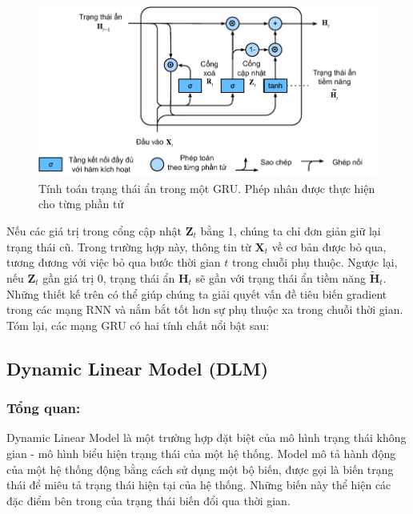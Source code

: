 \documentclass[conference]{IEEEtran}
\begin{document}
\begin{figure}[H]
    \centering
    \begin{minipage}{0.43\textwidth}
        \centering
        \includegraphics[width=1\textwidth]{bibliography/figure/GRU/gru_3.pdf}
        \caption{Tính toán trạng thái ẩn trong một GRU. Phép nhân được thực hiện cho từng phần tử}
        \label{fig:gru_up}
    \end{minipage}

\end{figure}

Nếu các giá trị trong cổng cập nhật $\mathbf{Z}_t$ bằng 1, chúng ta chỉ đơn giản giữ lại trạng thái cũ. Trong trường hợp này, thông tin từ $\mathbf{X}_t$ về cơ bản được bỏ qua, tương đương với việc bỏ qua bước thời gian $t$ trong chuỗi phụ thuộc. Ngược lại, nếu $\mathbf{Z}_t$ gần giá trị 0, trạng thái ẩn $\mathbf{H}_t$ sẽ gần với trạng thái ẩn tiềm năng $\tilde{\mathbf{H}}_t$. Những thiết kế trên có thể giúp chúng ta giải quyết vấn đề tiêu biến gradient trong các mạng RNN và nắm bắt tốt hơn sự phụ thuộc xa trong chuỗi thời gian. Tóm lại, các mạng GRU có hai tính chất nổi bật sau:

\subsection{Dynamic Linear Model (DLM)}
\subsubsection{Tổng quan:}
Dynamic Linear Model là một trường hợp đặt biệt của mô hình trạng thái không gian - mô hình biểu hiện trạng thái của một hệ thống. Model mô tả hành động của một hệ thống động bằng cách sử dụng một bộ biến, được gọi là biến trạng thái để miêu tả trạng thái hiện tại của hệ thống. Những biến này thể hiện các đặc điểm bên trong của trạng thái biến đổi qua thời gian.
\end{document}
